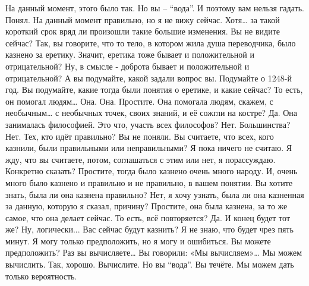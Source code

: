 \documentclass{extbook}
\newcommand{\soul}[1]{{#1}}
\newcommand{\people}[1]{{#1}}
\begin{document}
\soul{На данный  момент, этого было так. Но вы – ``вода''. И  поэтому вам  нельзя гадать. }
\people{Понял.}
\soul{На данный момент правильно, но я не вижу сейчас.  Хотя…  за такой короткий срок вряд ли  произошли такие большие изменения.}
\people{Вы не видите сейчас? Так, вы говорите, что то тело, в котором жила душа переводчика,  было  казнено за еретику. Значит,  еретика тоже бывает и положительной и  отрицательной? Ну, в смысле - доброта бывает и положительной и отрицательной?}
\soul{А вы подумайте, какой задали вопрос вы. Подумайте о 1248-й год. Вы подумайте,  какие тогда  были понятия о еретике,  и какие сейчас?}
\people{То есть, он помогал людям…}
\soul{Она.}
\people{Она. Простите. Она помогала людям,  скажем, с необычным… с   необычных  точек,  своих знаний,  и её сожгли на костре?}
\soul{Да. Она занималась  философией. }
\people{Это что, участь всех философов?}
\soul{Нет.}
\people{Большинства?}
\soul{Нет.}
\people{Тех, кто идёт правильно? }
\soul{Вы не поняли. Вы считаете, что всех, кого казнили, были правильными или неправильными?}
\people{Я пока ничего не считаю. Я жду, что вы считаете, потом, соглашаться с этим или нет, я порассуждаю.}
\soul{Конкретно сказать? Простите, тогда было казнено  очень много народу. И, очень много  было казнено  и правильно и не правильно,  в вашем понятии.  Вы хотите знать, была ли она казнена правильно?}
\people{Нет, я хочу узнать, была ли она казненная за данную, которую я сказал,  причину?}
\soul{Простите, она была казнена, за то же самое,  что она делает сейчас.}
\people{То есть, всё повторяется?}
\soul{Да.}
\people{И конец будет тот же? Ну, логически...}
\soul{Вас сейчас будут казнить?}
\people{Я не знаю, что будет чрез пять минут. Я могу только предположить, но я могу и ошибиться.  Вы можете предположить? Раз вы  вычисляете… Вы говорили:  «Мы вычисляем»…}
\soul{Мы можем вычислить. }
\people{Так, хорошо. Вычислите.}
\soul{Но вы ``вода''. Вы течёте. Мы можем дать только вероятность.}
\end{document}
